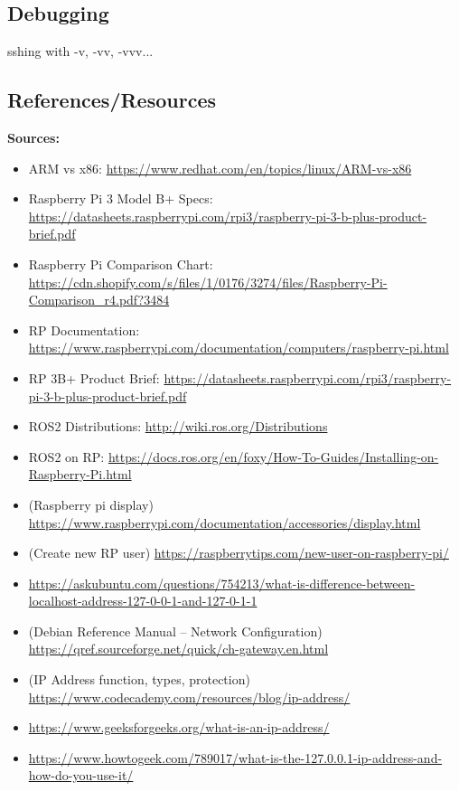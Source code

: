 \documentclass[a4paper, 10pt]{article}
\begin{document}
    \subsection{Debugging}
    sshing with -v, -vv, -vvv...
    
    \subsection{References/Resources}
        \textbf{Sources:}
        \begin{itemize}
          \item ARM vs x86: 
          \url{https://www.redhat.com/en/topics/linux/ARM-vs-x86}
          \item Raspberry Pi 3 Model B+ Specs: \url{https://datasheets.raspberrypi.com/rpi3/raspberry-pi-3-b-plus-product-brief.pdf}
          \item Raspberry Pi Comparison Chart: \url{https://cdn.shopify.com/s/files/1/0176/3274/files/Raspberry-Pi-Comparison_r4.pdf?3484}
          \item RP Documentation: \url{https://www.raspberrypi.com/documentation/computers/raspberry-pi.html}
          \item RP 3B+ Product Brief:
          \url{https://datasheets.raspberrypi.com/rpi3/raspberry-pi-3-b-plus-product-brief.pdf}
          \item ROS2 Distributions: \url{http://wiki.ros.org/Distributions}
          \item ROS2 on RP: \url{https://docs.ros.org/en/foxy/How-To-Guides/Installing-on-Raspberry-Pi.html}
          \item (Raspberry pi display) \url{https://www.raspberrypi.com/documentation/accessories/display.html}
        \item (Create new RP user) \url{https://raspberrytips.com/new-user-on-raspberry-pi/}
        \item \url{https://askubuntu.com/questions/754213/what-is-difference-between-localhost-address-127-0-0-1-and-127-0-1-1}
        \item (Debian Reference Manual – Network Configuration) \url{https://qref.sourceforge.net/quick/ch-gateway.en.html}
        \item (IP Address function, types, protection) \url{https://www.codecademy.com/resources/blog/ip-address/}
        \item \url{https://www.geeksforgeeks.org/what-is-an-ip-address/}
        \item \url{https://www.howtogeek.com/789017/what-is-the-127.0.0.1-ip-address-and-how-do-you-use-it/}

\end{itemize}
\end{document}
